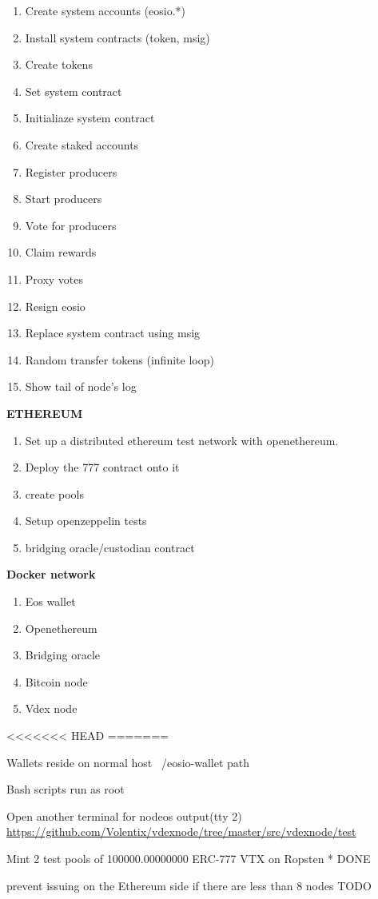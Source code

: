 \documentclass[]{article}
\begin{document}
\begin{enumerate}
		\item Create system accounts (eosio.*)
		\item Install system contracts (token, msig)
		\item Create tokens
		\item Set system contract
		\item Initialiaze system contract
		\item Create staked accounts
		\item Register producers
		\item Start producers
		\item Vote for producers
		\item Claim rewards
		\item Proxy votes
		\item Resign eosio
		\item Replace system contract using msig
		\item Random transfer tokens (infinite loop)
		\item Show tail of node's log
   	  \end{enumerate}   
	 \textbf{ETHEREUM}
	   \begin{enumerate}
	   	\item Set up a distributed ethereum test network with openethereum. \item Deploy the 777 contract onto it
	    \item create pools 
	   	\item Setup openzeppelin tests
	   	\item bridging oracle/custodian contract
	   	\end{enumerate}       
   \textbf{Docker network}	 
\begin{enumerate}
	\item Eos wallet
	\item Openethereum
	\item Bridging oracle
	\item Bitcoin node
	\item Vdex node
\end{enumerate}   

<<<<<<< HEAD
=======
  		    \item Wallets reside on normal host ~/eosio-wallet path
		   \item Bash scripts run as root
		   	\item Open another terminal for nodeos output(tty 2)
  			\url{https://github.com/Volentix/vdexnode/tree/master/src/vdexnode/test} 
 		  \item Mint 2 test pools of 100000.00000000 ERC-777 VTX on Ropsten  * {\color{green} DONE}
		  \item prevent issuing on the Ethereum side if there are less than 8 nodes {\color{red} TODO}
		   
\end{document}
